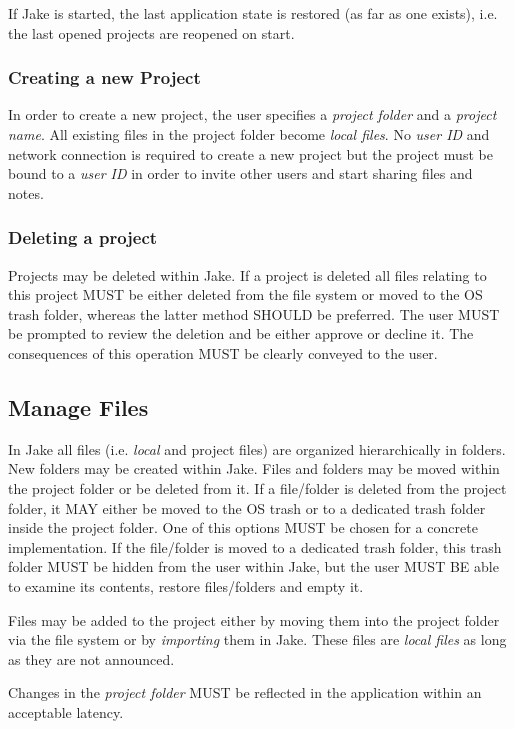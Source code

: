 If Jake is started, the last application state is restored (as far as one exists), i.e. the last opened projects are reopened on start.

\subsubsection{Creating a new Project}
In order to create a new project, the user specifies a \emph{project folder} and a \emph{project name}. All existing files in the project folder become \emph{local files}. No \emph{user ID} and network connection is required to create a new project but the project must be bound to a \emph{user ID} in order to invite other users and start sharing files and notes.

\subsubsection{Deleting a project}
Projects may be deleted within Jake. If a project is deleted all files relating to this project MUST be either deleted from the file system or moved to the OS trash folder, whereas the latter method SHOULD be preferred. The user MUST be prompted to review the deletion and be either approve or decline it. The consequences of this operation MUST be clearly conveyed to the user.

\subsection{Manage Files}
In Jake all files (i.e. \emph{local} and {project files}) are organized hierarchically in folders. New folders may be created within Jake. Files and folders may be moved within the project folder or be deleted from it. If a file/folder is deleted from the project folder, it MAY either be moved to the OS trash or to a dedicated trash folder inside the project folder. One of this options MUST be chosen for a concrete implementation. If the file/folder is moved to a dedicated trash folder, this trash folder MUST be hidden from the user within Jake, but the user MUST BE able to examine its contents, restore files/folders and empty it. 

Files may be added to the project either by moving them into the project folder via the file system or by \emph{importing} them in Jake. These files are \emph{local files} as long as they are not announced. 

Changes in the \emph{project folder} MUST be reflected in the application within an acceptable latency.

